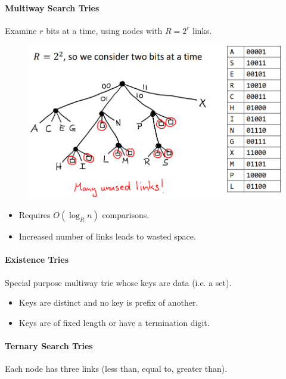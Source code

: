 \documentclass[twocolumn,english]{article}
\numberwithin{equation}{section}
\numberwithin{figure}{section}
\numberwithin{table}{section}
\begin{document}
\paragraph{Multiway Search Tries}

Examine $r$ bits at a time, using nodes with $R=2^{r}$ links.

\begin{figure}[H]
\centering{}\includegraphics[width=0.75\linewidth]{img/multiwayst}
\end{figure}
\begin{itemize}
\item Requires $O\left(\log_{R}n\right)$ comparisons.
\item Increased number of links leads to wasted space.
\end{itemize}

\paragraph{Existence Tries}

Special purpose multiway trie whose keys are data (i.e. a set).
\begin{itemize}
\item Keys are distinct and no key is prefix of another.
\item Keys are of fixed length or have a termination digit.
\end{itemize}

\paragraph{Ternary Search Tries}

Each node has three links (less than, equal to, greater than).
\end{document}

